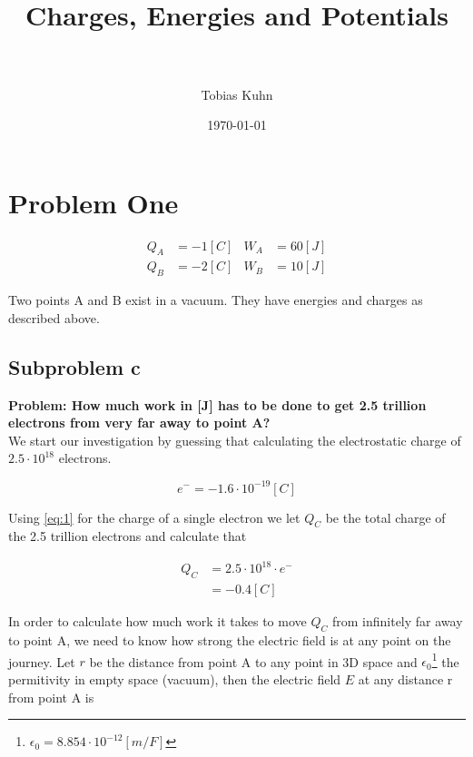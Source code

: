 \documentclass[paper=a4, fontsize=11pt]{scrartcl} %
\title{	
\normalfont \normalsize 
\horrule{0.5pt} \\[0.4cm] %
\huge Charges, Energies and Potentials \\ %
\horrule{2pt} \\[0.5cm] %
}
\author{Tobias Kuhn} %
\date{\normalsize\today} %
\numberwithin{equation}{section} %
\numberwithin{figure}{section} %
\numberwithin{table}{section} %
\begin{document}
\maketitle %


\section{Problem One}

\begin{align} 
Q_A &= -1[C] & W_A &= 60[J] \\
Q_B &= -2[C] & W_B &= 10[J] 
\end{align}

Two points A and B exist in a vacuum. They have energies and charges as described above.

\subsection{Subproblem c}
\textbf{Problem: How much work in [J] has to be done to get 2.5 trillion electrons from very far away to point A?}
\\

We start our investigation by guessing that calculating the electrostatic charge of $2.5 \cdot 10^{18}$ electrons.

\begin{equation} \label{eq:1}
e^- = -1.6 \cdot 10^{-19} [C]
\end{equation}

Using \ref{eq:1} for the charge of a single electron we let $Q_C$ be the total charge of the 2.5 trillion electrons and calculate that

\begin{align} \label{eq:2}
Q_C &= 2.5 \cdot 10^{18} \cdot e^- \\ &= -0.4 [C]
\end{align}

In order to calculate how much work it takes to move $Q_C$ from infinitely far away to point A,
we need to know how strong the electric field is at any point on the journey. 
Let $r$ be the distance from point A to any point in 3D space and $\epsilon_0$\footnote{$\epsilon_0 = 8.854 \cdot 10 ^ {-12} [m/F] $} the permitivity in empty space (vacuum),
then the electric field $E$ at any distance r from point A is 
\end{document}
